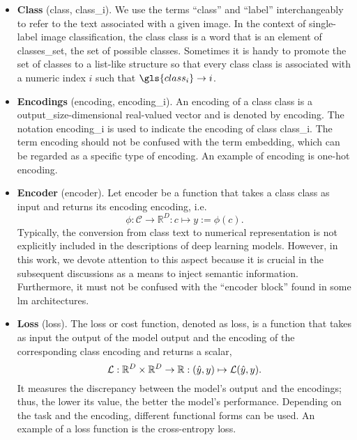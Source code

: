 \begin{itemize}
\item \textbf{Class} (\gls{class}, \gls{class_i}). We use the terms ``class'' and ``label'' interchangeably to refer to the text associated with a given image. In the context of single-label image classification, the class \gls{class} is a word that is an element of \gls{classes_set}, the set of possible classes. Sometimes it is handy to promote the set of classes to a list-like structure so that every class \gls{class} is associated with a numeric index $i$ such that $\gls{class_i} \to i$.

\item \textbf{Encodings} (\gls{encoding}, \gls{encoding_i}). An encoding of a class \gls{class} is a \gls{output_size}-dimensional real-valued vector and is denoted by \gls{encoding}. The notation \gls{encoding_i} is used to indicate the encoding of class \gls{class_i}. The term encoding should not be confused with the term embedding, which can be regarded as a specific type of encoding. An example of encoding is one-hot encoding.

\item \textbf{Encoder} (\gls{encoder}). Let \gls{encoder} be a function that takes a class \gls{class} as input and returns its encoding \gls{encoding}, i.e.\
\begin{equation}
  \phi: \mathcal{C} \to \mathbb{R}^{D} : c \mapsto y := \phi(c).
  \label{eq:encoder}
\end{equation}
Typically, the conversion from class text to numerical representation is not explicitly included in the descriptions of deep learning models. However, in this work, we devote attention to this aspect because it is crucial in the subsequent discussions as a means to inject semantic information. Furthermore, it must not be confused with the ``encoder block'' found in some \acrshort{lm} architectures.

\item \textbf{Loss} (\gls{loss}). The loss or cost function, denoted as \gls{loss}, is a function that takes as input the output of the model \gls{output} and the encoding of the corresponding class \gls{encoding} and returns a scalar,
\begin{equation}
  \operatorname{\mathcal{L}}: \mathbb{R}^{D} \times \mathbb{R}^{D} \to \mathbb{R}
       : (\hat{y}, y) \mapsto \operatorname{\mathcal{L}}(\hat{y}, y).
  \label{eq:loss}
\end{equation}
It measures the discrepancy between the model's output and the encodings; thus, the lower its value, the better the model's performance. Depending on the task and the encoding, different functional forms can be used. An example of a loss function is the cross-entropy loss.

\end{itemize}

